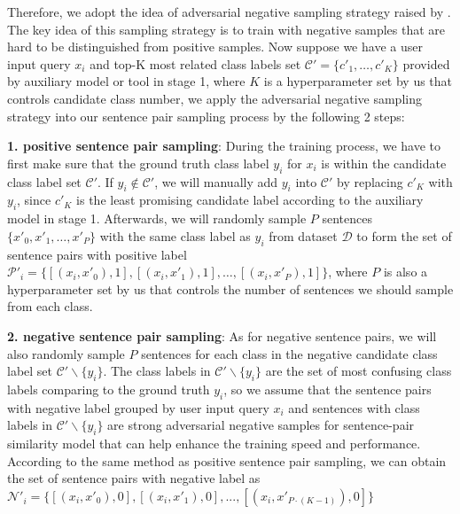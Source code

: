 \documentclass[letterpaper]{article} %
\begin{document}
  Therefore,  we adopt the idea of adversarial negative sampling strategy raised
  by   \cite{bamler2020extreme}.  The  key  idea  of this sampling strategy is to
  train  with  negative  samples that are hard to be distinguished from positive
  samples. Now suppose we have a user input query $x_{i}$ and top-K most related
  class   labels   set  $\mathcal{C'}=\{c'_{1},  \dots,  c'_{K}\}$  provided  by
  auxiliary  model  or  tool in stage 1, where $K$ is a hyperparameter set by us
  that  controls  candidate  class  number,  we  apply  the adversarial negative
  sampling  strategy  into our sentence pair sampling process by the following 2
  steps:

  \textbf{1.  positive  sentence pair sampling}: During the training process, we
  have  to first make sure that the ground truth class label $y_{i}$ for $x_{i}$
  is  within  the  candidate  class  label  set  $\mathcal{C'}$. If $y_{i}\notin
  \mathcal{C'}$,  we  will manually add $y_{i}$ into $\mathcal{C'}$ by replacing
  $c'_{K}$  with  $y_{i}$, since $c'_{K}$ is the least promising candidate label
  according  to  the  auxiliary  model  in stage 1. Afterwards, we will randomly
  sample  $P$  sentences  $\{x'_{0},x'_{1}, \dots, x'_{P}\}$ with the same class
  label as $y_{i}$ from dataset $\mathcal{D}$ to form the set of sentence pairs
  with   positive   label  $\mathcal{P'}_{i}=\{[(x_{i},  x'_{0}),  1],  [(x_{i},
  x'_{1}),   1],   \dots,   [(x_{i},   x'_{P}),  1]\}$,  where  $P$  is  also  a
  hyperparameter  set  by  us  that  controls  the number of sentences we should
  sample from each class.

  \textbf{2.  negative  sentence pair sampling}: As for negative sentence pairs,
  we  will  also  randomly  sample  $P$ sentences for each class in the negative
  candidate class label set $\mathcal{C'}\backslash \{y_{i}\}$. The class labels
  in  $\mathcal{C'}\backslash  \{y_{i}\}$  are  the  set of most confusing class
  labels comparing to the ground truth ${y_{i}}$, so we assume that the sentence
  pairs  with  negative  label grouped by user input query $x_{i}$ and sentences
  with class labels in $\mathcal{C'}\backslash \{y_{i}\}$ are strong adversarial
  negative  samples for sentence-pair similarity model that can help enhance the
  training  speed  and  performance.  According  to  the same method as positive
  sentence  pair sampling, we can obtain the set of sentence pairs with negative
  label  as $\mathcal{N'}_{i}=\{[(x_{i}, x'_{0}), 0], [(x_{i}, x'_{1}), 0], ...,
  [(x_{i}, x'_{P\cdot (K-1)}), 0]\}$
\end{document}

